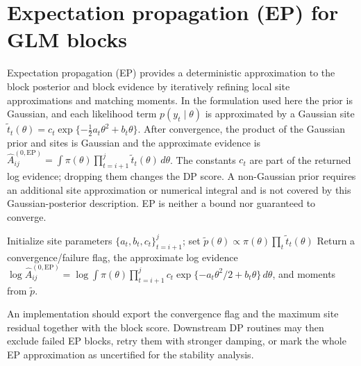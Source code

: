 \section{Expectation propagation (EP) for GLM blocks}
Expectation propagation (EP) \citep{minka2001ep} provides a deterministic approximation to the
block posterior and block evidence by iteratively refining local site approximations and matching
moments. In the formulation used here the prior is Gaussian, and each likelihood term
$p(y_t\mid\theta)$ is approximated by a Gaussian site
$\tilde t_t(\theta)=c_t\exp\{-\tfrac{1}{2}a_t\theta^2+b_t\theta\}$. After convergence, the product
of the Gaussian prior and sites is Gaussian and the approximate evidence is
$\widehat A^{(0,\mathrm{EP})}_{ij}=\int \pi(\theta)\prod_{t=i+1}^j \tilde t_t(\theta)\,d\theta$.
The constants $c_t$ are part of the returned log evidence; dropping them changes the DP score.
A non-Gaussian prior requires an additional site approximation or numerical integral and is not
covered by this Gaussian-posterior description. EP is neither a bound nor guaranteed to converge.

\begin{algorithm}[H]
\caption{GLMBlock\_EP$(y,w,i,j,\texttt{prior})$}
\label{alg:ep}
Initialize site parameters $\{a_t,b_t,c_t\}_{t=i+1}^j$; set $\tilde p(\theta)\propto\pi(\theta)\prod_t \tilde t_t(\theta)$\;
Return a convergence/failure flag, the approximate log evidence
$\log\widehat A^{(0,\mathrm{EP})}_{ij}=\log\int \pi(\theta)\prod_{t=i+1}^j c_t\exp\{-a_t\theta^2/2+b_t\theta\}\,d\theta$, and moments from $\tilde p$.
\end{algorithm}

An implementation should export the convergence flag and the maximum site residual together with the
block score. Downstream DP routines may then exclude failed EP blocks, retry them with stronger
damping, or mark the whole EP approximation as uncertified for the stability analysis.


